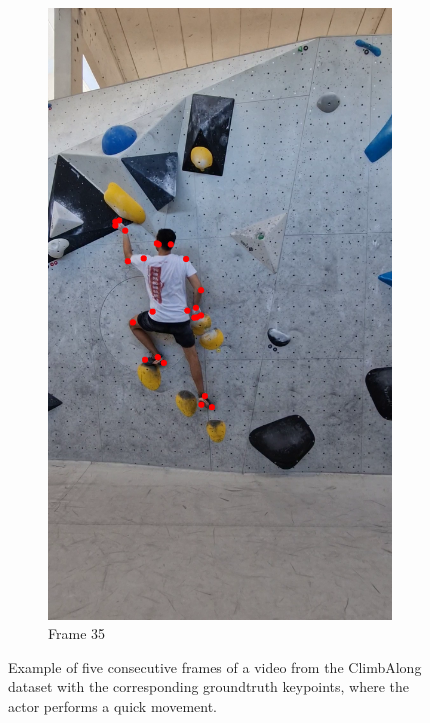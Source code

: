 \documentclass[./main.tex]{subfiles}
\begin{document}
\begin{figure}[htbp]
\begin{subfigure}{0.3\textwidth}
        \includegraphics[width=\textwidth]{entities/CA_35.png}
        \caption{Frame 35}
    \end{subfigure}

    \caption{Example of five consecutive frames of a video from the ClimbAlong dataset with the corresponding groundtruth keypoints, where the actor performs a quick movement.}
    \label{fig:CA_dataset_quick}
\end{figure}
\end{document}
